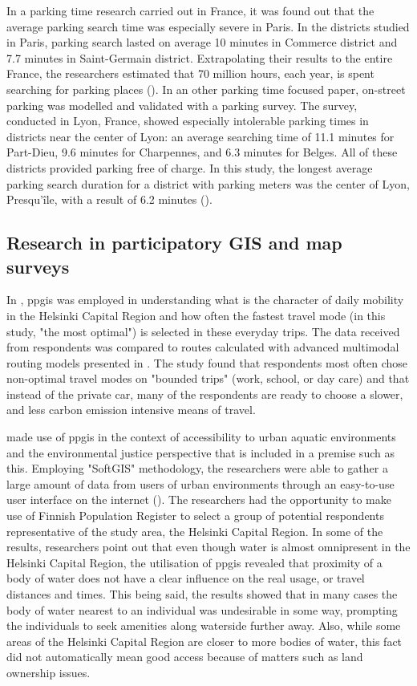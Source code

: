 In a parking time research carried out in France, it was found out that the average parking search time was especially severe in Paris. In the districts studied in Paris, parking search lasted on average 10 minutes in Commerce district and 7.7 minutes in Saint-Germain district. Extrapolating their results to the entire France, the researchers estimated that 70 million hours, each year, is spent searching for parking places (\cite{Gantelet2006}). In an other parking time focused paper, on-street parking was modelled and validated with a parking survey. The survey, conducted in Lyon, France, showed especially intolerable parking times in districts near the center of Lyon: an average searching time of 11.1 minutes for Part-Dieu, 9.6 minutes for Charpennes, and 6.3 minutes for Belges. All of these districts provided parking free of charge. In this study, the longest average parking search duration for a district with parking meters was the center of Lyon, Presqu'île, with a result of 6.2 minutes (\cite{Belloche2015}).

\subsection{Research in participatory GIS and map surveys}
\justify

In , \acrfull{ppgis} was employed in understanding what is the character of daily mobility in the Helsinki Capital Region and how often the fastest travel mode (in this study, "the most optimal") is selected in these everyday trips. The data received from respondents was compared to routes calculated with advanced multimodal routing models presented in . The study found that respondents most often chose non-optimal travel modes on "bounded trips" (work, school, or day care) and that instead of the private car, many of the respondents are ready to choose a slower, and less carbon emission intensive means of travel.

 made use of \acrshort{ppgis} in the context of accessibility to urban aquatic environments and the environmental justice perspective that is included in a premise such as this. Employing "SoftGIS" methodology, the researchers were able to gather a large amount of data from users of urban environments through an easy-to-use user interface on the internet (\cite{Kytta2011}). The researchers had the opportunity to make use of Finnish Population Register to select a group of potential respondents representative of the study area, the Helsinki Capital Region. In some of the results, researchers point out that even though water is almost omnipresent in the Helsinki Capital Region, the utilisation of \acrshort{ppgis} revealed that proximity of a body of water does not have a clear influence on the real usage, or travel distances and times. This being said, the results showed that in many cases the body of water nearest to an individual was undesirable in some way, prompting the individuals to seek amenities along waterside further away. Also, while some areas of the Helsinki Capital Region are closer to more bodies of water, this fact did not automatically mean good access because of matters such as land ownership issues.

